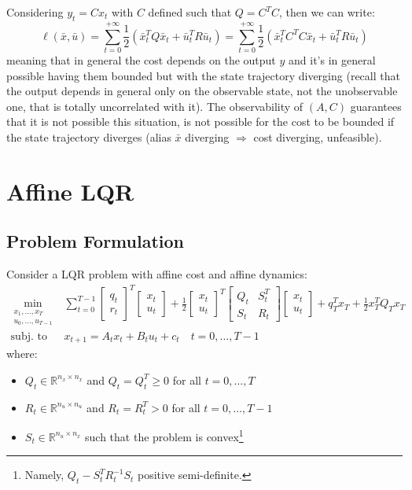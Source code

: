 \documentclass[openany]{book}
\newcommand{\R}{\mathbb{R}}               %
\theoremstyle{definition}
\theoremstyle{remark}
\begin{document}
Considering $y_t = Cx_t$ with $C$ defined such that $Q = C^TC$, then we can write:
\[
    \ell(\bar{x},\bar{u}) = \sum_{t=0}^{+\infty}\frac{1}{2}(\bar{x}_t^TQ\bar{x}_t + \bar{u}_t^TR\bar{u}_t) = \sum_{t=0}^{+\infty}\frac{1}{2}(\bar{x}_t^TC^TC\bar{x}_t + \bar{u}_t^TR\bar{u}_t)
\]
meaning that in general the cost depends on the output $y$ and it's in general possible having them bounded but with the state trajectory diverging (recall that the output depends in general only on the observable state, not the unobservable one, that is totally uncorrelated with it). The observability of $(A,C)$ guarantees that it is not possible this situation, is not possible for the cost to be bounded if the state trajectory diverges (alias $\bar{x}$ diverging $\Rightarrow$ cost diverging, unfeasible).

\section{Affine LQR}

\subsection{Problem Formulation}
Consider a LQR problem with affine cost and affine dynamics:
\begin{align*}
    \min_{\substack{x_1,\dots,x_T\\u_0,\dots,u_{T-1}}} & \displaystyle\sum_{t=0}^{T-1} \begin{bmatrix}
        q_t \\ r_t
    \end{bmatrix}^T \begin{bmatrix}
        x_t \\ u_t
    \end{bmatrix} + \frac{1}{2}\begin{bmatrix}
        x_t \\ u_t
    \end{bmatrix}^T \begin{bmatrix}
        Q_t & S_t^T \\ S_t & R_t
    \end{bmatrix} \begin{bmatrix}
        x_t \\ u_t
    \end{bmatrix} + q_T^Tx_T + \frac{1}{2}x_T^TQ_Tx_T\\
    \text{subj. to } & x_{t+1} = A_tx_t + B_tu_t + c_t \quad t = 0,\dots,T-1
\end{align*}
where:
\begin{itemize}
    \item $Q_t\in\R^{n_x\times n_x}$ and $Q_t = Q_t^T \geq 0$ for all $t = 0,\dots,T$
    \item $R_t\in\R^{n_u\times n_u}$ and $R_t = R_t^T > 0$ for all $t = 0,\dots,T-1$
    \item $S_t\in\R^{n_u\times n_x}$ such that the problem is convex\footnote{Namely, $Q_t - S_t^TR_t^{-1}S_t$ positive semi-definite.}
\end{itemize}
\end{document}
